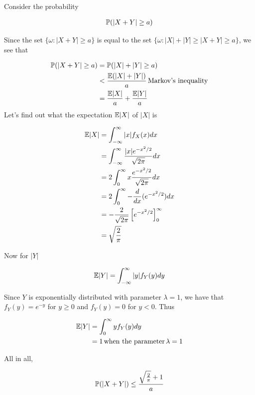 
Consider the probability 

\begin{align*}
    \P( |X+Y| \geq a) 
\end{align*}

Since the set $ \{ \omega: |X+Y| \geq a \} $ is equal to the set $ \{ \omega: |X| + |Y| \geq |X+Y|
\geq a \} $, we see that

\begin{align*}
    \P( |X+Y| \geq a) &= \P( |X| + |Y| \geq a) \\
		      &< \frac{ \E(|X| + |Y|)}{a} \, \mbox{Markov's inequality}  \\
		      &= \frac{\E |X|}{a} + \frac{\E |Y|}{a}\\ 
\end{align*}
Let's find out what the expectation $ \E |X| $ of $ |X|$ is

\begin{align*}
    \E |X| &= \int_{-\infty}^{\infty} |x| f_{X} (x) dx\\
           &= \int_{-\infty}^{\infty} \frac{ |x| e^{-x^2/2} }{\sqrt{2\pi}} dx\\
	   &= 2 \int_{0}^{\infty} x \frac{e^{-x^2/2} }{\sqrt{2\pi}} dx\\
	   &= 2 \int_{0}^{\infty} - \frac{d}{dx} (e^{-x^2/2})dx \\
	   &= - \frac{2}{\sqrt{2\pi}} \left[ e^{-x^2/2}  \right]_{0}^{\infty} \\
	   &= \sqrt{ \frac{2}{\pi}  }
\end{align*}

Now for $ |Y|$

\begin{align*}
    \E |Y| &= \int_{-\infty}^{\infty} |y| f_{Y}(y) dy\\ 
\end{align*}

Since $ Y$ is exponentially distributed with parameter $ \lambda = 1$, we have that $ f_{Y} (y) =
e^{-y} $ for $ y \geq 0$ and $ f_{Y} (y) = 0$ for $ y < 0$. Thus

\begin{align*}
    \E |Y| &= \int_{0}^{\infty} y f_{Y} (y) dy\\
	   &= 1 \, \mbox{when the parameter} \, \lambda =1 
\end{align*}

All in all,


\begin{align*}
    \P(|X + Y|) \leq \frac{\sqrt{ \frac{2}{\pi}} +1}{a} 
\end{align*}
